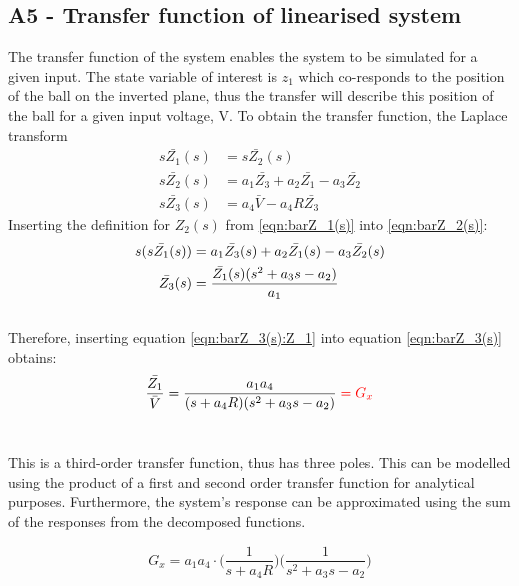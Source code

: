 \documentclass[a4paper,10pt,reqno]{amsart}
\numberwithin{equation}{section}
\begin{document}
\subsection{A5 - Transfer function of linearised system}\label{sec:A5} 

\par The transfer function of the system enables the system to be simulated for a given input. The state variable of interest is $z_1$ which co-responds to the position of the ball on the inverted plane, thus the transfer will describe this position of the ball for a given input voltage, V. To obtain the transfer function, the Laplace transform
\begin{subequations}
\begin{align}
    s\bar{Z_1}(s) &{}={} s\bar{Z_2}(s)\label{eqn:barZ_1(s)}
    \\
    s\bar{Z_2}(s) &{}={} a_1\bar{Z_3}+a_2\bar{Z_1}-a_3\bar{Z_2}\label{eqn:barZ_2(s)}
    \\
     s\bar{Z_3}(s) &{}={} a_4\bar{V}-a_4R\bar{Z_3}\label{eqn:barZ_3(s)}
\end{align}
\end{subequations}
Inserting the definition for $Z_2(s)$ from \ref{eqn:barZ_1(s)} into \ref{eqn:barZ_2(s)}:
\begin{align}
    s(s\bar{Z_1}(s)) &{}={} a_1\bar{Z_3}(s)+a_2\bar{Z_1}(s)-a_3\bar{Z_2}(s)\notag
    \\
    \bar{Z_3}(s) &{}={} \frac{\bar{Z_1}(s)(s^2+a_3s-a_2)}{a_1}\label{eqn:barZ_3(s):Z_1}
\end{align}
\\
Therefore, inserting equation \ref{eqn:barZ_3(s):Z_1} into equation \ref{eqn:barZ_3(s)} obtains:
\begin{equation}
    \frac{\bar{Z_1}}{\bar{V}}=\frac{a_1a_4}{(s+a_4R)(s^2+a_3s-a_2)}\color{red}= G_x\color{black}
\end{equation}
\\

\par This is a third-order transfer function, thus has three poles. This can be modelled using the product of a first and second order transfer function for analytical purposes. Furthermore, the system's response can be approximated using the sum of the responses from the decomposed functions.

\begin{equation}
    G_x = a_1a_4\cdot\bigg(\frac{1}{s+a_4R}\bigg)\bigg(\frac{1}{s^2+a_3s-a_2}\bigg)
\end{equation}
\end{document}
